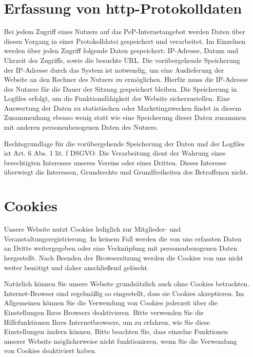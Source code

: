 \documentclass[
  fontsize=12pt,
  paper=a4,
  DIV14,
  parskip,
]{scrartcl}
\begin{document}
\section{Erfassung von http-Protokolldaten}

Bei jedem Zugriff eines Nutzers auf das PeP-Internetangebot werden Daten über
diesen Vorgang in einer Protokolldatei gespeichert und verarbeitet.
Im Einzelnen werden über jeden Zugriff folgende Daten gespeichert:
IP-Adresse, Datum und Uhrzeit des Zugriffs, sowie die besuchte URL.
Die vorübergehende Speicherung der IP-Adresse durch das System ist notwendig,
um eine Auslieferung der Website an den Rechner des Nutzers zu ermöglichen.
Hierfür muss die IP-Adresse des Nutzers für die Dauer der Sitzung gespeichert
bleiben.
Die Speicherung in Logfiles erfolgt, um die Funktionsfähigkeit der Website
sicherzustellen. Eine Auswertung der Daten zu statistischen oder
Marketingzwecken findet in diesem Zusammenhang ebenso wenig statt wie eine
Speicherung dieser Daten zusammen mit anderen personenbezogenen Daten des
Nutzers.

Rechtsgrundlage für die vorübergehende Speicherung der Daten und der Logfiles
ist Art. 6 Abs. 1 lit. f DSGVO. Die Verarbeitung dient der Wahrung eines
berechtigten Interesses unseres Vereins oder eines Dritten. Dieses Interesse
überwiegt die Interessen, Grundrechte und Grundfreiheiten des Betroffenen
nicht.

\section{Cookies}

Unsere Website nutzt Cookies lediglich zur Mitglieder- und
Veranstaltungsregistrierung.
In keinem Fall werden die von uns erfassten Daten an Dritte weitergegeben
oder eine Verknüpfung mit personenbezogenen Daten hergestellt.
Nach Beenden der Browsersitzung werden die Cookies von uns nicht weiter
benötigt und daher anschließend gelöscht.

Natürlich können Sie unsere Website grundsätzlich auch ohne Cookies betrachten.
Internet-Browser sind regelmäßig so eingestellt, dass sie Cookies akzeptieren.
Im Allgemeinen können Sie die Verwendung von Cookies jederzeit über die
Einstellungen Ihres Browsers deaktivieren.
Bitte verwenden Sie die Hilfefunktionen Ihres Internetbrowsers, um zu
erfahren, wie Sie diese Einstellungen ändern können.
Bitte beachten Sie, dass einzelne Funktionen unserer Website möglicherweise
nicht funktionieren, wenn Sie die Verwendung von Cookies deaktiviert haben.
\end{document}
